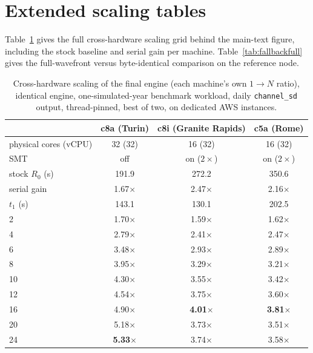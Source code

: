\documentclass[12pt]{article}
\begin{document}
\section{Extended scaling tables}\label{si:scaling}
Table~\ref{tab:crosshwfull} gives the full cross-hardware scaling grid behind the main-text
figure, including the stock baseline and serial gain per machine. Table~\ref{tab:fallbackfull}
gives the full-wavefront versus byte-identical comparison on the reference node.

\begin{table}[h]
\centering
\caption{Cross-hardware scaling of the final engine (each machine's own $1\rightarrow N$ ratio),
identical engine, one-simulated-year benchmark workload, daily \texttt{channel\_sd} output,
thread-pinned, best of two, on dedicated AWS instances.}
\label{tab:crosshwfull}
\begin{tabular}{lccc}
\toprule
 & c8a (Turin) & c8i (Granite Rapids) & c5a (Rome) \\
\midrule
physical cores (vCPU) & 32 (32) & 16 (32) & 16 (32) \\
SMT                   & off & on ($2\times$) & on ($2\times$) \\
stock $R_0$ (s) & 191.9 & 272.2 & 350.6 \\
serial gain     & 1.67$\times$ & 2.47$\times$ & 2.16$\times$ \\
$t_1$ (s)       & 143.1 & 130.1 & 202.5 \\
\midrule
2  & 1.70$\times$ & 1.59$\times$ & 1.62$\times$ \\
4  & 2.79$\times$ & 2.41$\times$ & 2.47$\times$ \\
6  & 3.48$\times$ & 2.93$\times$ & 2.89$\times$ \\
8  & 3.95$\times$ & 3.29$\times$ & 3.21$\times$ \\
10 & 4.30$\times$ & 3.55$\times$ & 3.42$\times$ \\
12 & 4.54$\times$ & 3.75$\times$ & 3.60$\times$ \\
16 & 4.90$\times$ & \textbf{4.01$\times$} & \textbf{3.81$\times$} \\
20 & 5.18$\times$ & 3.73$\times$ & 3.51$\times$ \\
24 & \textbf{5.33$\times$} & 3.74$\times$ & 3.58$\times$ \\
\bottomrule
\end{tabular}
\end{table}
\end{document}
